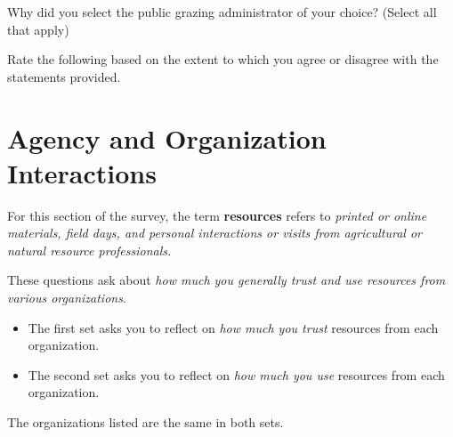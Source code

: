 \documentclass[
  english,
  checkmode = fill,
  ]{sdapsclassic}
\begin{document}
\begin{sloppypar}
\begin{questionnaire}
    \begin{choicequestion}[cols=3]{Why did you select the public grazing administrator of your choice? (Select all that apply)}
    \end{choicequestion}
    
    
     \begin{markgroup}[rowsep=0.33em]{Rate the following based on the extent to which you agree or disagree with the statements provided.}
       {}~{}
       {}~{}
       {}~{}
       {}~{}
       {}~{}
       {}~{}
    \end{markgroup}    
    
    \section{Agency and Organization Interactions}
    
 For this section of the survey, the term \textbf{resources} refers to \emph{printed or online materials, field days, and personal interactions or visits from agricultural or natural resource professionals.}

These questions ask about \emph{how much you generally trust and use resources from various organizations}. 
	\begin{itemize}
		\item The first set asks you to reflect on \emph{how much you trust} resources from each organization. 
		\item The second set asks you to reflect on \emph{how much you use} resources from each organization.  
	\end{itemize}
The organizations listed are the same in both sets.


\end{questionnaire}
\end{sloppypar}
\end{document}
